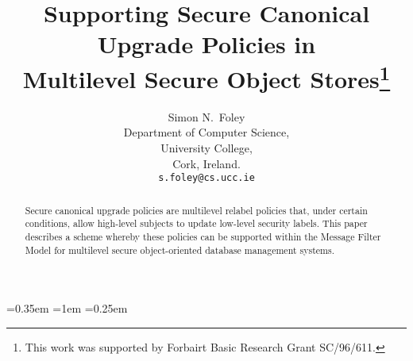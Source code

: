 


\zedindent=0.35em
\zedtab=1em
\zedleftsep=0.25em

\newcommand{\s}[1]	 {{\tt #1}}               %
\newtheorem{aex}{Example}
\newenvironment{ex}{\begin{aex}\rm}{\hfill$\triangle$\end{aex}}

\newcommand{\fleq}{\leq}
\newcommand{\fneq}{|}
\newcommand{\isat}{\sim}
\newcommand{\lproj}{\project}
\newcommand{\Rfun}{\mbox{$\cal F_{R}$}}
\newcommand{\LEVEL}{C}
\newcommand{\LABEL}{L}
\newcommand{\FID}{F}
\newcommand{\Invisible}{\mbox{\tt Invisible}}
\newcommand{\Object}{\mbox{\tt Obj}}
\newcommand{\Proxy}{\mbox{\tt Prxy}}
\newcommand{\lo}{\mbox{\tt Lo}}
\newcommand{\hi}{\mbox{\tt Hi}}
\newcommand{\mlo}{\mbox{\tt Mlo}}
\newcommand{\invis}{\mbox{\tt Invisible}}

\newcommand{\lev}{\gamma}




\title{Supporting Secure Canonical Upgrade Policies in \\
Multilevel Secure Object Stores\thanks{This work was supported by Forbairt 
Basic Research Grant SC/96/611.}
}

\author{Simon N.~Foley\\
Department of Computer Science,\\
University College, \\
Cork, Ireland. \\
\verb/s.foley@cs.ucc.ie/}



\maketitle

\begin{abstract}
Secure canonical upgrade policies are multilevel relabel  policies
that, under certain conditions, allow high-level subjects to update
low-level security labels.  This paper describes a scheme whereby these
policies can be supported within the Message Filter Model for
multilevel secure object-oriented database management systems.
\end{abstract}

